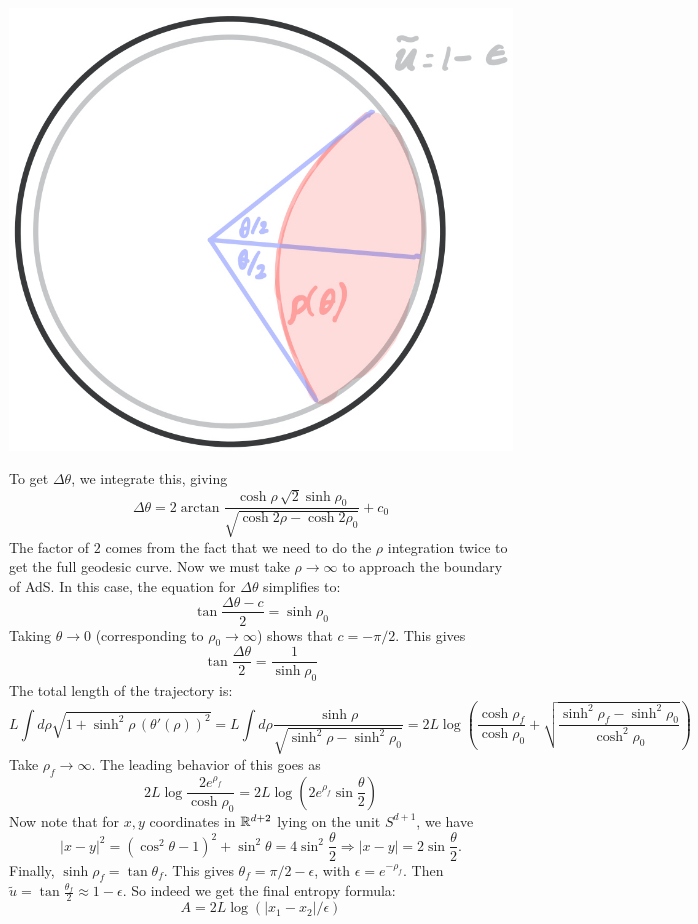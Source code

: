 \documentclass[11pt, class=article, crop=false]{standalone}
\begin{document}
\begin{enumerate}
	\begin{center}
		\includegraphics[scale=0.2]{"Drawings/Ads Area"}
	\end{center}
	
	To get $\Delta \theta$, we integrate this, giving
	\[
		\Delta \theta = 2 \arctan \frac{\cosh \rho\, \sqrt{2} \sinh \rho_0}{\sqrt{\cosh 2 \rho - \cosh 2 \rho_0}} + c_0
	\]
	The factor of $2$ comes from the fact that we need to do the $\rho$ integration twice to get the full geodesic curve. Now we must take $\rho \to \infty$ to approach the boundary of AdS. In this case, the equation for $\Delta \theta$ simplifies to:
	\[
		\tan \frac{\Delta \theta - c}{2}  = \sinh \rho_0
	\]
	Taking $\theta \to 0$ (corresponding to $\rho_0 \to \infty$) shows that $c = -\pi /2$. This gives
	\[
		\tan \frac{\Delta \theta }{2}  = \frac{1}{\sinh \rho_0}
	\]
	The total length of the trajectory is:
	\[
		L \int d\rho \sqrt{1 + \sinh^2 \rho
		\, (\theta'(\rho))^2} = L \int d\rho \frac{\sinh \rho}{\sqrt{\sinh^2 \rho - \sinh^2 \rho_0}} = 2 L  \log\left(\frac{\cosh \rho_f}{\cosh \rho_0}  +  \sqrt{\frac{\sinh^2 \rho_f - \sinh^2 \rho_0}{\cosh^2 \rho_0}}\right)
	\]
	Take $\rho_f \to \infty$. The leading behavior of this goes as
	\[
		2 L \log \frac{2 e^{\rho_f}}{\cosh \rho_0} = 2 L \log \left(2 e^{\rho_f} \sin \frac{\theta}{2} \right)
	\]
	Now note that for $x, y$ coordinates in $\mathbb{R}^{d+2}$ lying on the unit $S^{d+1}$, we have 
	\[
		|x-y|^2 = (\cos^2 \theta - 1)^2 + \sin^2 \theta = 4 \sin^2 \frac{\theta}{2} \Rightarrow |x-y| = 2 \sin \frac{\theta}{2}.
	\]
	Finally, $\sinh \rho_f = \tan \theta_f$. This gives $\theta_f = \pi/2 - \epsilon$, with $\epsilon = e^{-\rho_f}$. Then $\tilde u = \tan \frac{\theta_f}{2} \approx 1-\epsilon$. So indeed we get the final entropy formula:
	\[
		A = 2 L \log (|x_1-x_2|/\epsilon)
	\]
	

\end{enumerate}
\end{document}
